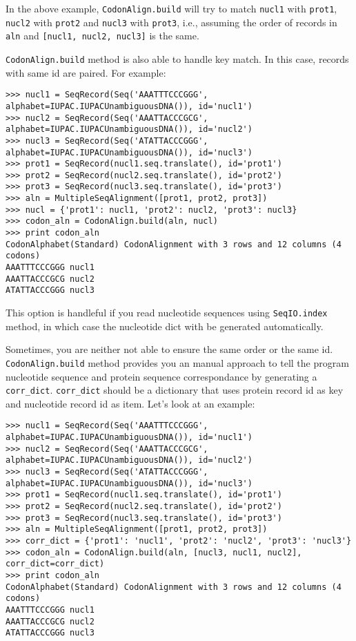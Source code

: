 \documentclass{article}
\begin{document}
In the above example, \texttt{CodonAlign.build} will try to match
\texttt{nucl1} with \texttt{prot1}, \texttt{nucl2} with \texttt{prot2}
and \texttt{nucl3} with \texttt{prot3}, i.e., assuming the order of
records in \texttt{aln} and \texttt{{[}nucl1, nucl2, nucl3{]}} is the
same.

\texttt{CodonAlign.build} method is also able to handle key match. In
this case, records with same id are paired. For example:

\begin{verbatim}
>>> nucl1 = SeqRecord(Seq('AAATTTCCCGGG', alphabet=IUPAC.IUPACUnambiguousDNA()), id='nucl1')
>>> nucl2 = SeqRecord(Seq('AAATTACCCGCG', alphabet=IUPAC.IUPACUnambiguousDNA()), id='nucl2')
>>> nucl3 = SeqRecord(Seq('ATATTACCCGGG', alphabet=IUPAC.IUPACUnambiguousDNA()), id='nucl3')
>>> prot1 = SeqRecord(nucl1.seq.translate(), id='prot1')
>>> prot2 = SeqRecord(nucl2.seq.translate(), id='prot2')
>>> prot3 = SeqRecord(nucl3.seq.translate(), id='prot3')
>>> aln = MultipleSeqAlignment([prot1, prot2, prot3])
>>> nucl = {'prot1': nucl1, 'prot2': nucl2, 'prot3': nucl3}
>>> codon_aln = CodonAlign.build(aln, nucl)
>>> print codon_aln
CodonAlphabet(Standard) CodonAlignment with 3 rows and 12 columns (4 codons)
AAATTTCCCGGG nucl1
AAATTACCCGCG nucl2
ATATTACCCGGG nucl3
\end{verbatim}

This option is handleful if you read nucleotide sequences using
\texttt{SeqIO.index} method, in which case the nucleotide dict with be
generated automatically.

Sometimes, you are neither not able to ensure the same order or the same
id. \texttt{CodonAlign.build} method provides you an manual approach to
tell the program nucleotide sequence and protein sequence correspondance
by generating a \texttt{corr\_dict}. \texttt{corr\_dict} should be a
dictionary that uses protein record id as key and nucleotide record id
as item. Let's look at an example:

\begin{verbatim}
>>> nucl1 = SeqRecord(Seq('AAATTTCCCGGG', alphabet=IUPAC.IUPACUnambiguousDNA()), id='nucl1')
>>> nucl2 = SeqRecord(Seq('AAATTACCCGCG', alphabet=IUPAC.IUPACUnambiguousDNA()), id='nucl2')
>>> nucl3 = SeqRecord(Seq('ATATTACCCGGG', alphabet=IUPAC.IUPACUnambiguousDNA()), id='nucl3')
>>> prot1 = SeqRecord(nucl1.seq.translate(), id='prot1')
>>> prot2 = SeqRecord(nucl2.seq.translate(), id='prot2')
>>> prot3 = SeqRecord(nucl3.seq.translate(), id='prot3')
>>> aln = MultipleSeqAlignment([prot1, prot2, prot3])
>>> corr_dict = {'prot1': 'nucl1', 'prot2': 'nucl2', 'prot3': 'nucl3'}
>>> codon_aln = CodonAlign.build(aln, [nucl3, nucl1, nucl2], corr_dict=corr_dict)
>>> print codon_aln
CodonAlphabet(Standard) CodonAlignment with 3 rows and 12 columns (4 codons)
AAATTTCCCGGG nucl1
AAATTACCCGCG nucl2
ATATTACCCGGG nucl3
\end{verbatim}
\end{document}
